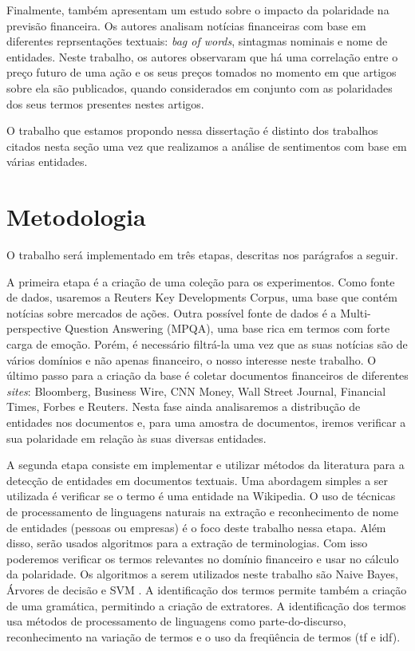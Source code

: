 \documentclass[a4paper,12pt]{article}
\begin{document}
Finalmente, \cite{azsystem} também apresentam um estudo sobre o impacto da polaridade na previsão financeira. Os autores analisam notícias financeiras com base em diferentes reprsentações textuais: \textit{bag of words}, sintagmas nominais e nome de entidades. Neste trabalho, os autores observaram que há uma correlação entre o preço futuro de uma ação e os seus preços tomados no momento em que artigos sobre ela são publicados, quando considerados em conjunto com as polaridades dos seus termos presentes nestes artigos.

O trabalho que estamos propondo nessa dissertação é distinto dos trabalhos citados nesta seção uma vez que realizamos a análise de sentimentos com base em várias entidades.

\section{Metodologia}

O trabalho será implementado em três etapas, descritas nos parágrafos a seguir. 

A primeira etapa é a criação de uma coleção para os experimentos. Como fonte de dados, usaremos a Reuters Key Developments Corpus, uma base que contém notícias sobre mercados de ações. 
Outra possível fonte de dados é a Multi-perspective Question Answering (MPQA), uma base rica em termos com forte carga de emoção. Porém, é necessário filtrá-la uma vez que as suas notícias são de vários domínios e não apenas financeiro, o nosso interesse neste trabalho. O último passo para a criação da base é coletar documentos financeiros de diferentes \textit{sites}: Bloomberg, Business Wire, CNN Money, Wall Street Journal, Financial Times, Forbes e Reuters. Nesta fase ainda analisaremos a distribução de entidades nos documentos e, para uma amostra de documentos, iremos verificar a sua polaridade em relação às suas diversas entidades.

A segunda etapa consiste em implementar e utilizar métodos da literatura para a detecção de entidades em documentos textuais. Uma abordagem simples a ser utilizada é verificar se o termo é uma entidade na Wikipedia. O uso de técnicas de processamento de linguagens naturais na extração e reconhecimento de nome de entidades (pessoas ou empresas) é o foco deste trabalho nessa etapa. Além disso, serão usados algoritmos para a extração de terminologias. Com isso poderemos verificar os termos relevantes no domínio financeiro e usar no cálculo da polaridade. Os algoritmos a serem utilizados neste trabalho são Naive Bayes, Árvores de decisão e SVM \cite{Witten}. A identificação dos termos permite também a criação de uma gramática, permitindo a criação de extratores. A identificação dos termos usa métodos de processamento de linguagens como parte-do-discurso, reconhecimento na variação de termos e o uso da freqüência de termos (tf e idf). 
\end{document}
